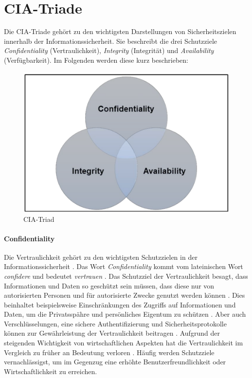 \section{CIA-Triade}

Die CIA-Triade gehört zu den wichtigsten Darstellungen von Sicherheitszielen innerhalb der Informationssicherheit. Sie beschreibt die drei Schutzziele \textit{Confidentiality} (Vertraulichkeit), \textit{Integrity} (Integrität) und \textit{Availability} (Verfügbarkeit). Im Folgenden werden diese kurz beschrieben:

\begin{figure}[h]
	\centering 
	\includegraphics[width=0.5
    \textwidth]{img/abbildungen/CIA-Triad.png}
	\captionsetup{format=hang}
	\caption{CIA-Triad \cite{samonas2014cia}} \label{CIA-Triad}
\end{figure}

\paragraph*{Confidentiality} 
Die Vertraulichkeit gehört zu den wichtigsten Schutzzielen in der Informationssicherheit \cite{samonas2014cia}. Das Wort \textit{Confidentiality} kommt vom lateinischen Wort \textit{confidere} und bedeutet \textit{vertrauen} \cite{pons} \cite{samonas2014cia}. Das Schutzziel der Vertraulichkeit besagt, dass Informationen und Daten so geschützt sein müssen, dass diese nur von autorisierten Personen und für autorisierte Zwecke genutzt werden können \cite{samonas2014cia}. 
Dies beinhaltet beispielsweise Einschränkungen des Zugriffs auf Informationen und Daten, um die Privatsspähre und persönliches Eigentum zu schützen \cite{samonas2014cia}. Aber auch Verschlüsselungen, eine sichere Authentifizierung und Sicherheitsprotokolle können zur Gewährleistung der Vertraulichkeit beitragen \cite{agarwal2011security}.
Aufgrund der steigenden Wichtigkeit von wirtschaftlichen Aspekten hat die Vertraulichkeit im Vergleich zu früher an Bedeutung verloren \cite{samonas2014cia}. Häufig werden Schutzziele vernachlässigst, um im Gegenzug eine erhöhte Benutzerfreundlichkeit oder Wirtschaftlichkeit zu erreichen.

